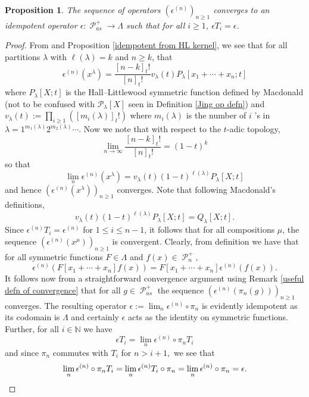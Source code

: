 \documentclass[11pt]{article}
\newtheorem{prop}[theo]{Proposition}
\theoremstyle{definition}
\numberwithin{equation}{section}
\DeclareMathOperator{\sP}{\mathscr{P} }
\begin{document}
\begin{prop}\label{idempotents converge}
    The sequence of operators $(\epsilon^{(n)})_{n\geq 1}$ converges to an idempotent operator $\epsilon: \sP_{as}^{+} \rightarrow \Lambda$ such that for all $i \geq 1$, $\epsilon T_i = \epsilon$.
\end{prop}
\begin{proof}
    From \cite[Chapter 3, Section 2, (2.1), page 208]{Macdonald} and Proposition \ref{idempotent from HL kernel}, we see that for all partitions $\lambda$ with $\ell(\lambda) = k$ and $n \geq k$, that 
    \begin{equation}
        \epsilon^{(n)}(x^{\lambda}) = \frac{[n-k]_{t}!}{[n]_{t}!} v_{\lambda}(t) P_{\lambda}[x_1+\cdots + x_n;t]
    \end{equation}
where $P_{\lambda}[X;t]$ is the Hall--Littlewood symmetric function defined by Macdonald (not to be confused with $\mathcal{P}_{\lambda}[X]$ seen in Definition \ref{Jing op defn}) and 
$v_{\lambda}(t) := \prod_{i \geq 1}([m_i(\lambda)]_{t}!)$ where $m_i(\lambda)$ is the number of $i$
's in $\lambda = 1^{m_1(\lambda)}2^{m_2(\lambda)}\cdots$. Now we note that with respect to the $t$-adic topology,
$$\lim_{n \rightarrow \infty} \frac{[n-k]_{t}!}{[n]_{t}!} = (1-t)^k$$ so that 
$$ \lim_{n} \epsilon^{(n)}(x^{\lambda}) = v_{\lambda}(t)(1-t)^{\ell(\lambda)}P_{\lambda}[X;t] $$
and hence $(\epsilon^{(n)}(x^{\lambda}))_{n \geq 1}$ converges.
Note that following Macdonald's definitions, 
$$v_{\lambda}(t)(1-t)^{\ell(\lambda)}P_{\lambda}[X;t] = Q_{\lambda}[X;t].$$
Since $\epsilon^{(n)}T_i = \epsilon^{(n)}$ for $1\leq i \leq n-1$, it follows that for all compositions $\mu$, the sequence $(\epsilon^{(n)}(x^{\mu}))_{n \geq 1}$ is convergent. Clearly, from definition we have that for all symmetric functions $F \in \Lambda$ and $f(x) \in \sP_n^{+},$
$$\epsilon^{(n)}(F[x_1+ \cdots + x_n]f(x)) = F[x_1+ \cdots + x_n] \epsilon^{(n)}(f(x)).$$ It follows now from a straightforward convergence argument using Remark \ref{useful defn of convergence} that for all $g \in \sP_{as}^{+}$ the sequence $(\epsilon^{(n)}(\pi_n(g)))_{n\geq 1}$ converges. The resulting operator $\epsilon:= \lim_{n} \epsilon^{(n)}\circ \pi_n$ is evidently idempotent as its codomain is $\Lambda$ and certainly $\epsilon$ acts as the identity on symmetric functions. Further, for all $i \in \mathbb{N}$ we have  
$$ \epsilon T_i = \lim_{n} \epsilon^{(n)}\circ \pi_n T_i $$
and since $\pi_n$ commutes with $T_i$ for $n > i + 1,$ we see that 
\[\lim_{n} \epsilon^{(n)}\circ \pi_n T_i = \lim_{n} \epsilon^{(n)} T_i \circ \pi_n = \lim_{n} \epsilon^{(n)} \circ \pi_n  = \epsilon. \qedhere\]
\end{proof}
\end{document}
